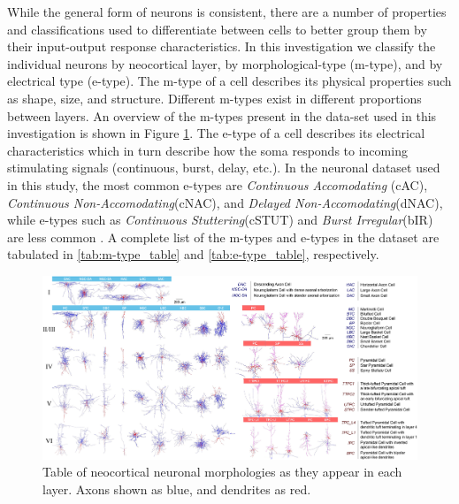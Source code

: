 While the general form of neurons is consistent, there are a number of properties and classifications used to differentiate between cells to better group them by their input-output response characteristics. In this investigation we classify the individual neurons by neocortical layer, by morphological-type (m-type), and by electrical type (e-type). The m-type of a cell describes its physical properties such as shape, size, and structure. Different m-types exist in different proportions between layers. An overview of the m-types present in the data-set used in this investigation is shown in Figure \ref{mtypeOverview}. The e-type of a cell describes its electrical characteristics which in turn describe how the soma responds to incoming stimulating signals (continuous, burst, delay, etc.). In the neuronal dataset used in this study, the most common e-types are \emph{Continuous Accomodating} (cAC), \emph{Continuous Non-Accomodating}(cNAC), and \emph{Delayed Non-Accomodating}(dNAC), while e-types such as \emph{Continuous Stuttering}(cSTUT) and \emph{Burst Irregular}(bIR) are less common \cite{reconSim}. A complete list of the m-types and e-types in the dataset are tabulated in \ref{tab:m-type_table} and \ref{tab:e-type_table}, respectively.
\begin{figure}
    \centering
    \includegraphics[width=\textwidth]{02-Background/mtypes.jpg}
    \caption{Table of neocortical neuronal morphologies \cite{reconSim} as they appear in each layer. Axons shown as blue, and dendrites as red.}
    \label{mtypeOverview}
\end{figure}

\par

